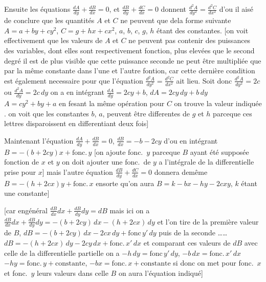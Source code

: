 \documentclass[11pt,a4paper]{article}
\begin{document}
Ensuite les équations $\frac{dA}{dy} + \frac{dB}{dx} = 0$, et $\frac{dB}{dy} + \frac{dC}{dx} = 0$ donnent $\frac{d^{2}A}{dy^{2}} = \frac{d^{2}C}{dx^{2}}$
d'ou il aisé de conclure que les quantités $A$ et $C$ ne peuvent que dela forme
suivante $A = a + by + cy^{2}$, $C = g + hx + cx^{2}$, $a$, $b$, $c$, $g$, $h$ étant des constantes.
[on voit effectivement que les valeurs de $A$ et $C$ ne peuvent pas contenir des puissances
des variables, dont elles sont respectivement fonction, plus elevées que le second
degré il est de plus visible que cette puissance seconde  ne peut être
multipliée que par la même constante dans l'une et l'autre fontion, car
cette dernière condition est également necessaire pour que l'équation
$\frac{d^{2}A}{dy^{2}} = \frac{d^{2}C}{dx^{2}}$ ait lieu. Soit donc $\frac{d^{2}A}{dy^{2}} = 2c$ ou $\frac{d^{2}A}{dy} = 2c\,dy$ on a en intégrant
\quad $\frac{dA}{dy} = 2cy + b$, $dA = 2cy\,dy + b\,dy$
\quad $A = cy^{2} + by + a$
en fesant la même opération pour $C$
on trouve la valeur indiquée \struck{\ill{}}. on voit que
les constantes $b$, $a$, peuvent être differentes de $g$ et $h$ parceque ces
lettres disparoissent \struck{\ill{}} en differentiant deux fois]

Maintenant l'équation $\frac{dA}{dy} + \frac{dB}{dx} = 0$, $\frac{dB}{dx} = -b - 2cy$ d'ou en intégrant $B = -(b + 2cy)x + \text{fonc.}\,y$
[on ajoute fonc.\ $y$ parceque $B$ ayant été supposée fonction de $x$ et $y$ on doit ajouter une fonc.\ de $y$ a l'intégrale
de la differentielle prise pour $x$] mais l'autre équation $\frac{dB}{dy} + \frac{dC}{dx} = 0$ donnera demême
$B = -(h + 2cx)y + \text{fonc.}\,x$ ensorte qu'on aura $B = k - bx - hy - 2cxy$, $k$ étant une constante]

[car engénéral $\frac{dB}{dx}dx + \frac{dB}{dy}dy = dB$ mais ici on a $\frac{dB}{dx}dx + \frac{dB}{dy}dy = -(b + 2cy)\,dx - (h + 2cx)\,dy$
et l'on tire de la première valeur de $B$, $dB = -(b + 2cy)\,dx - 2cx\,dy + \text{fonc}\,y'\,dy$ puis de
la seconde \ldots\ldots \quad $dB = -(h + 2cx)\,dy - 2cy\,dx + \text{fonc.}\,x'\,dx$
et comparant ces valeurs de $dB$ avec celle de la differentielle partielle
on a $-h\,dy = \text{fonc}\,y'\,dy$, \quad $-b\,dx = \text{fonc.}\,x'\,dx$
\quad $-hy = \text{fonc.}\,y + \text{constante}$, \quad $-bx = \text{fonc.}\,x + \text{constante}$ 
si donc on met pour fonc.\ $x$ et fonc.\ $y$ leurs valeurs dans celle $B$ on aura
l'équation indiqué]
\end{document}
